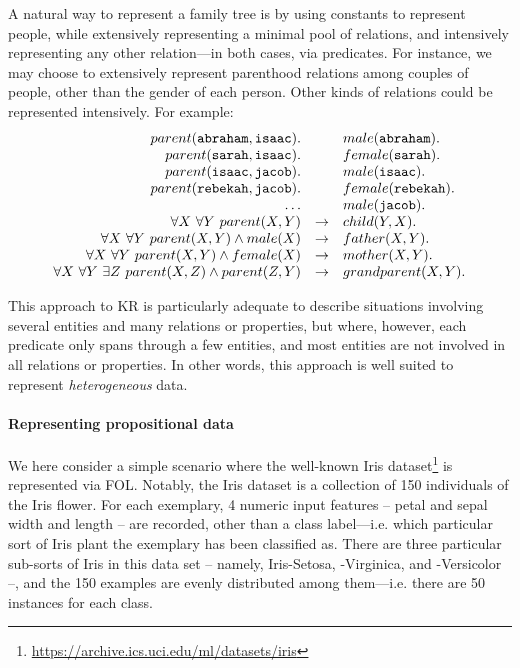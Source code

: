 \documentclass[12pt,a4paper,openright,twoside]{book}
\begin{document}
A natural way to represent a family tree is by using constants to represent people, while extensively representing a minimal pool of relations, and intensively representing any other relation---in both cases, via predicates.
%
For instance, we may choose to extensively represent parenthood relations among couples of people, other than the gender of each person.
%
Other kinds of relations could be represented intensively.
%
For example:
%
\begin{equation}\label{eq:abraham-family-tree}
    \begin{array}{rcl}
        parent(\mathtt{abraham}, \mathtt{isaac}). & {} & male(\mathtt{abraham}).
        \\
        parent(\mathtt{sarah}, \mathtt{isaac}). & {} & female(\mathtt{sarah}).
        \\
        parent(\mathtt{isaac}, \mathtt{jacob}). & {} & male(\mathtt{isaac}).
        \\
        parent(\mathtt{rebekah}, \mathtt{jacob}). & {} & female(\mathtt{rebekah}).
        \\
        \ldots & {} & male(\mathtt{jacob}).
        \\
        \forall X ~ \forall Y\ parent(X, Y) & \rightarrow & child(Y, X).
        \\
        \forall X ~ \forall Y\ parent(X, Y) \wedge male(X) & \rightarrow & father(X, Y).
        \\
        \forall X ~ \forall Y\ parent(X, Y) \wedge female(X) & \rightarrow & mother(X, Y).
        \\
        \forall X ~ \forall Y ~ \exists Z \ parent(X, Z) \wedge parent(Z, Y) & \rightarrow & grandparent(X, Y).
    \end{array}
\end{equation}

This approach to KR is particularly adequate to describe situations involving several entities and many relations or properties, but where, however, each predicate only spans through a few entities, and most entities are not involved in all relations or properties.
%
In other words, this approach is well suited to represent \emph{heterogeneous} data.

\paragraph{Representing propositional data}\label{sec:kr-tabular-data}

We here consider a simple scenario where the well-known Iris dataset\footnote{\url{https://archive.ics.uci.edu/ml/datasets/iris}} is represented via FOL.
%
Notably, the Iris dataset is a collection of 150 individuals of the Iris flower.
%
For each exemplary, 4 numeric input features -- petal and sepal width and length -- are recorded, other than a class label---i.e. which particular sort of Iris plant the exemplary has been classified as.
%
There are three particular sub-sorts of Iris in this data set -- namely, Iris-Setosa, -Virginica, and -Versicolor --, and the 150 examples are evenly distributed among them---i.e. there are 50 instances for each class.
\end{document}
